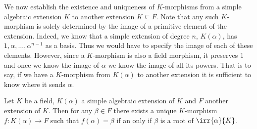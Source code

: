\documentclass[12pt,oneside]{book}
\begin{document}
We now establish the existence and uniqueness of \( K \)-morphisms from a simple
algebraic extension \( K \) to another extension \( K \subseteq F \). Note that any such
\( K \)-morphism is solely determined by the image of a primitive element of the
extension. Indeed, we know that a simple extension of degree \( n \), \( K(\alpha) \), has
\( 1, \alpha, \dots, \alpha^{n-1} \) as a basis. Thus we would have to specify the image
of each of these elements. However, since a \( K \)-morphism is also a field morphism, it
preserves 1 and once we know the image of \( \alpha \) we know the image of all its
powers. That is to say, if we have a \( K \)-morphism from \( K(\alpha) \) to another
extension it is sufficient to know where it sends \( \alpha \). 
\begin{lemma}\label{lemma:morphism extension I}
	Let \( K \) be a field, \( K(\alpha) \) a simple algebraic extension of \( K \) and
	\( F \) another extension of \( K \). Then for any \( \beta \in F \) there exists a
	unique \( K	\)-morphism \( f \colon K(\alpha) \to F \) such that \( f(\alpha) = \beta \)
	if an only if \( \beta \) is a root of \( \irr{\alpha}{K} \).
\end{lemma}
\end{document}

